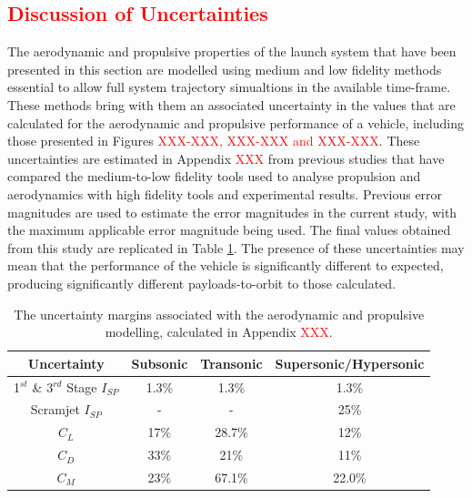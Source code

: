 \textcolor{red}{
	\section{Discussion of Uncertainties}
}


The aerodynamic and propulsive properties of the launch system that have been presented in this section are modelled using medium and low fidelity methods essential to allow full system trajectory simualtions in the available time-frame. These methods bring with them an associated uncertainty in the values that are calculated for the aerodynamic and propulsive performance of a vehicle, including those presented in Figures \textcolor{red}{XXX-XXX, XXX-XXX and XXX-XXX}. These uncertainties are estimated in Appendix \textcolor{red}{XXX} from previous studies that have compared the medium-to-low fidelity tools used to analyse propulsion and aerodynamics with high fidelity tools and experimental results. Previous error magnitudes are used to estimate the error magnitudes in the current study, with the maximum applicable error magnitude being used. The final values obtained from this study are replicated in Table \ref{tab:AppendixUncertaintyCopy}. The presence of these uncertainties may mean that the performance of the vehicle is significantly different to expected, producing significantly different payloads-to-orbit to those calculated. 

\begin{table}[ht]
	\centering
	\begin{tabular}{|c|c|c|c|}
		\hline  Uncertainty & Subsonic & Transonic  & Supersonic/Hypersonic \\ 
		\hline  1$^{st}$ \& 3$^{rd}$ Stage $I_{SP}$ & 1.3\% & 1.3\% &  1.3\% \\ 
		\hline  Scramjet $I_{SP}$ & - & - &  25\% \\ 
		\hline   $C_L$ & 17\% & 28.7\% & 12\% \\  
		\hline   $C_D$ & 33\% & 21\% & 11\% \\  
		\hline   $C_M$  & 23\% & 67.1\% &  22.0\% \\ 
		\hline 
	\end{tabular}
	\caption{The uncertainty margins associated with the aerodynamic and propulsive modelling, calculated in Appendix \textcolor{red}{XXX}.}
	\label{tab:AppendixUncertaintyCopy}
\end{table}


